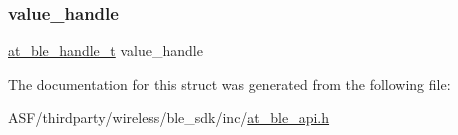 \mbox{\label{structat__ble__characteristic__found__t_a784b76919ceb578bc00cc11238adb573}} 
\subsubsection{\texorpdfstring{value\_handle}{value\_handle}}
{\footnotesize\ttfamily \mbox{\hyperlink{at__ble__api_8h_abd23646d0c662860741f787efc8456f2}{at\+\_\+ble\+\_\+handle\+\_\+t}} value\+\_\+handle}



The documentation for this struct was generated from the following file\+:\begin{DoxyCompactItemize}
\item 
A\+S\+F/thirdparty/wireless/ble\+\_\+sdk/inc/\mbox{\hyperlink{at__ble__api_8h}{at\+\_\+ble\+\_\+api.\+h}}\end{DoxyCompactItemize}
